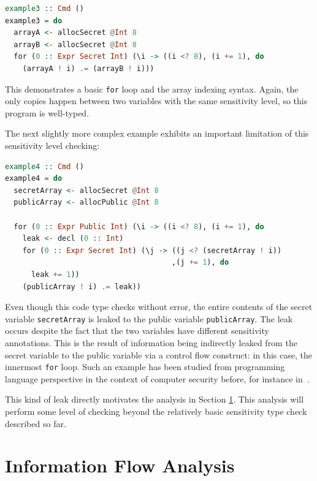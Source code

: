 \documentclass[10pt, conference]{IEEEtran}
\newcommand{\ttt}{\texttt}
\begin{document}
\begin{lstlisting}[language=Haskell]
example3 :: Cmd ()
example3 = do
  arrayA <- allocSecret @Int 8
  arrayB <- allocSecret @Int 8
  for (0 :: Expr Secret Int) (\i -> ((i <? 8), (i += 1), do
    (arrayA ! i) .= (arrayB ! i)))
\end{lstlisting}

\noindent This demonstrates a basic \ttt{for} loop and the array indexing syntax. Again, the
only copies happen between two variables with the same sensitivity level, so this
program is well-typed.

The next slightly more complex example exhibits an important limitation of this sensitivity level checking:

\begin{lstlisting}[language=Haskell]
example4 :: Cmd ()
example4 = do
  secretArray <- allocSecret @Int 8
  publicArray <- allocPublic @Int 8

  for (0 :: Expr Public Int) (\i -> ((i <? 8), (i += 1), do
    leak <- decl (0 :: Int)
    for (0 :: Expr Secret Int) (\j -> ((j <? (secretArray ! i))
                                      ,(j += 1), do
      leak += 1))
    (publicArray ! i) .= leak))
\end{lstlisting}

\noindent Even though this code type checks without error, the entire contents of the secret variable \ttt{secretArray} is leaked
to the public variable \ttt{publicArray}. The leak occurs despite the fact that the two variables have different
sensitivity annotations. This is the
result of information being indirectly leaked from the secret variable to the
public variable via a control flow construct: in this case, the innermost \ttt{for} loop. Such an example has been studied from programming language perspective in the
context of computer security before, for instance
in~\cite{InfoFlowAnalysis}.

This kind of leak directly motivates the analysis in Section \ref{sec:Analysis}. This analysis will perform
some level of checking beyond the relatively basic sensitivity type check described so far.

\section{Information Flow Analysis}
\label{sec:Analysis}
\end{document}
